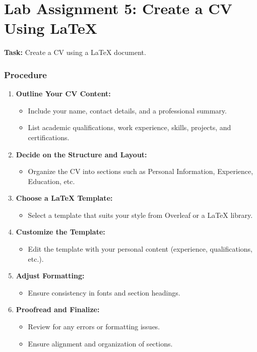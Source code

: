 \documentclass[a4paper,12pt]{report}
\begin{document}
\section{Lab Assignment 5: Create a CV Using LaTeX}

\textbf{Task:} Create a CV using a LaTeX document.

\subsubsection*{Procedure}
\begin{enumerate}[label=\arabic*.]
    \item \textbf{Outline Your CV Content:}
    \begin{itemize}
        \item Include your name, contact details, and a professional summary.
        \item List academic qualifications, work experience, skills, projects, and certifications.
    \end{itemize}

    \item \textbf{Decide on the Structure and Layout:}
    \begin{itemize}
        \item Organize the CV into sections such as Personal Information, Experience, Education, etc.
    \end{itemize}

    \item \textbf{Choose a LaTeX Template:}
    \begin{itemize}
        \item Select a template that suits your style from Overleaf or a LaTeX library.
    \end{itemize}

    \item \textbf{Customize the Template:}
    \begin{itemize}
        \item Edit the template with your personal content (experience, qualifications, etc.).
    \end{itemize}

    \item \textbf{Adjust Formatting:}
    \begin{itemize}
        \item Ensure consistency in fonts and section headings.
    \end{itemize}

    \item \textbf{Proofread and Finalize:}
    \begin{itemize}
        \item Review for any errors or formatting issues.
        \item Ensure alignment and organization of sections.
    \end{itemize}


\end{enumerate}
\end{document}

